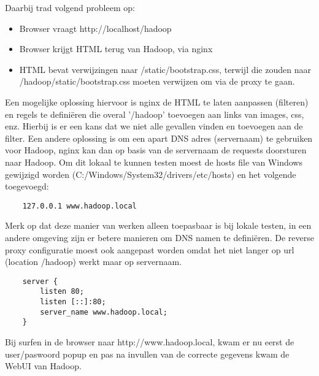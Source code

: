 Daarbij trad volgend probleem op:
\newline
\newline
\begin{itemize}
    \item Browser vraagt http://localhost/hadoop
    \item Browser krijgt HTML terug van Hadoop, via nginx
    \item HTML bevat verwijzingen naar /static/bootstrap.css, terwijl die zouden naar /hadoop/static/bootstrap.css moeten verwijzen om via de proxy te gaan.
\end{itemize}


Een mogelijke oplossing hiervoor is nginx de HTML te laten aanpassen (filteren) en regels te definiëren die overal '/hadoop' toevoegen aan links van images, css, enz. Hierbij is er een kans dat we niet alle gevallen vinden en toevoegen aan de filter.
Een andere oplossing is om een apart DNS adres (servernaam) te gebruiken voor Hadoop, nginx kan dan op basis van de servernaam de requests doorsturen naar Hadoop. Om dit lokaal te kunnen testen moest de hosts file van Windows gewijzigd worden 
\newline
(C:/Windows/System32/drivers/etc/hosts) en het volgende toegevoegd:
\begin{lstlisting}
    127.0.0.1 www.hadoop.local
\end{lstlisting}

Merk op dat deze manier van werken alleen toepasbaar is bij lokale testen, in een andere omgeving zijn er betere manieren om DNS namen te definiëren.
\newline
De reverse proxy configuratie moest ook aangepast worden omdat het niet langer op url (location /hadoop) werkt maar op servernaam.
\newline
\newline
\begin{lstlisting}
    server {
        listen 80;
        listen [::]:80;
        server_name www.hadoop.local;
    }
\end{lstlisting}

Bij surfen in de browser naar http://www.hadoop.local, kwam er nu eerst de user/paswoord popup en pas na invullen van de correcte gegevens kwam de WebUI van Hadoop.

